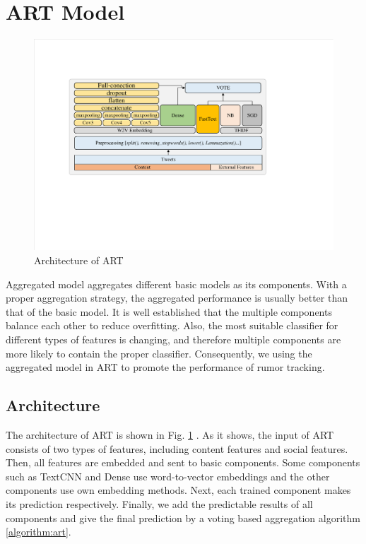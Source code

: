 \section{ART Model}
\label{sec:model}

\begin{figure}[htbp]
	\hspace{0ex}
	\vspace{0ex}
	\centering
	\includegraphics[width = \textwidth]{fig/structure}
	\caption{Architecture of ART}
	\label{fig:architecture}
\end{figure}

Aggregated model \cite{DBLP:conf/iccl2/Soto-FerrariCEH19, DBLP:conf/icccsec/WenYTWZSTYW18, DBLP:conf/wsc/LaippleMSWF18} aggregates different basic models as its components. With a proper aggregation strategy, the aggregated performance is usually better than that of the basic model. It is well established that the multiple components balance each other to reduce overfitting. Also, the most suitable classifier for different types of features is changing, and therefore multiple components are more likely to contain the proper classifier. Consequently, we using the aggregated model in ART to promote the performance of rumor tracking. 

\subsection{Architecture}
\label{sec:architecture}
The architecture of ART is shown in Fig. \ref{fig:architecture} . As it shows, the input of  ART consists of two types of features, including content features and social features. Then, all features are embedded and sent to basic components.  Some components such as TextCNN and Dense use word-to-vector embeddings and the other components use own embedding methods. Next, each trained component makes its prediction respectively. Finally, we add the predictable results of all components and give the final prediction by a voting based aggregation algorithm \ref{algorithm:art}.

